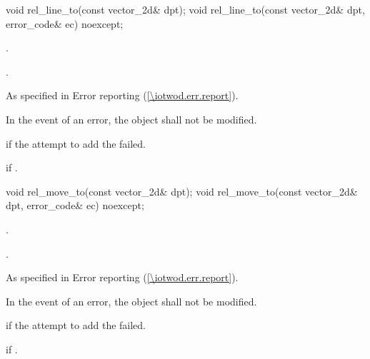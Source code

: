 \begin{itemdecl}
    void rel_line_to(const vector_2d& dpt);
    void rel_line_to(const vector_2d& dpt, error_code& ec) noexcept;
\end{itemdecl}
\begin{itemdescr}
	\pnum
	\effects
	.
	
	\pnum
	.
	
	\pnum
	\throws
	As specified in Error reporting (\ref{\iotwod.err.report}).

	\pnum
	\remarks
	In the event of an error, the object shall not be modified.

	\pnum
	\errors
	 if the attempt to add the  failed.
	
	\pnum
	 if .
\end{itemdescr}

\begin{itemdecl}
    void rel_move_to(const vector_2d& dpt);
    void rel_move_to(const vector_2d& dpt, error_code& ec) noexcept;
\end{itemdecl}
\begin{itemdescr}
	\pnum
	\effects
	.
	
	\pnum
	.
	
	\pnum
	\throws
	As specified in Error reporting (\ref{\iotwod.err.report}).

	\pnum
	\remarks
	In the event of an error, the object shall not be modified.

	\pnum
	\errors
	 if the attempt to add the  failed.
	
	\pnum
	 if .
\end{itemdescr}

